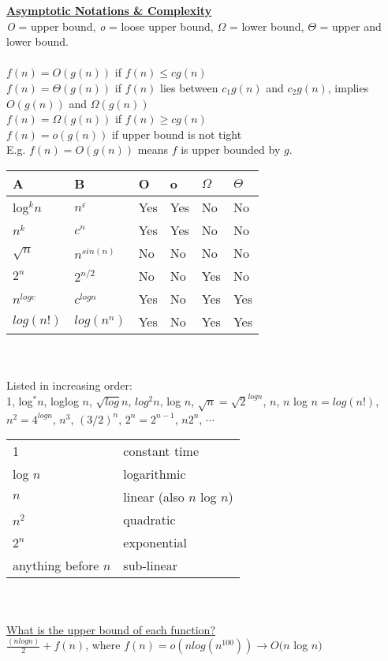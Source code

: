 \documentclass[8pt,letterpaper,twocolumn]{article}
\begin{document}
\underline{\textbf{Asymptotic Notations \& Complexity}}\\
\emph{O} = upper bound, \emph{o} = loose upper bound, $\Omega$ = lower bound, $\Theta$ = upper and lower bound.\\ \\
$f(n)=O(g(n))$ if $f(n) \leq cg(n)$\\
$f(n)=\Theta(g(n))$ if $f(n)$ lies between $c_1g(n)$ and $c_2g(n)$, implies $O(g(n))$ and $\Omega(g(n))$\\
$f(n)=\Omega(g(n))$ if $f(n) \geq cg(n)$\\
$f(n)=o(g(n))$ if upper bound is not tight\\
E.g. $f(n)=O(g(n))$ means $f$ is upper bounded by $g$.\\
\begin{tabular}{|l|l|l|l|l|l|}
\hline
A & B & O & o & $\Omega$ & $\Theta$\\
\hline
log$^kn$ & $n^\varepsilon$ & Yes & Yes & No & No \\
\hline
$n^k$ & $c^n$ & Yes & Yes & No & No \\
\hline
$\sqrt{n}$ & $n^{sin(n)}$ & No & No & No & No \\
\hline
$2^n$ & $2^{n/2}$ & No & No & Yes & No \\
\hline
$n^{logc}$ & $c^{logn}$ & Yes & No & Yes & Yes \\
\hline
$log(n!)$ & $log(n^n)$ & Yes & No & Yes & Yes\\
\hline
\end{tabular}\\
\\
Listed in increasing order:\\
1, log$^*n$, loglog $n$, $\sqrt{log}n$, $log^2n$, log $n$, $\sqrt{n}=\sqrt{2}^{log n}$, $n$,
$n$ log $n=log(n!)$, $n^2=4^{logn}$, $n^3$, $(3/2)^n$, $2^n=2^{n-1}$, $n2^n$, $\cdots$\\
\begin{tabular}{l l}
1 & constant time\\
log $n$ & logarithmic\\
$n$ & linear (also $n$ log $n$)\\
$n^2$ & quadratic\\
$2^n$ & exponential\\
anything before $n$ & sub-linear
\end{tabular}\\ \\
\underline{What is the upper bound of each function?}\\
$\frac{(n log n)}{2} + f(n)$, where $f(n) = o(n log(n^{100})) \rightarrow O(n$ log $n)$\\
\end{document}
